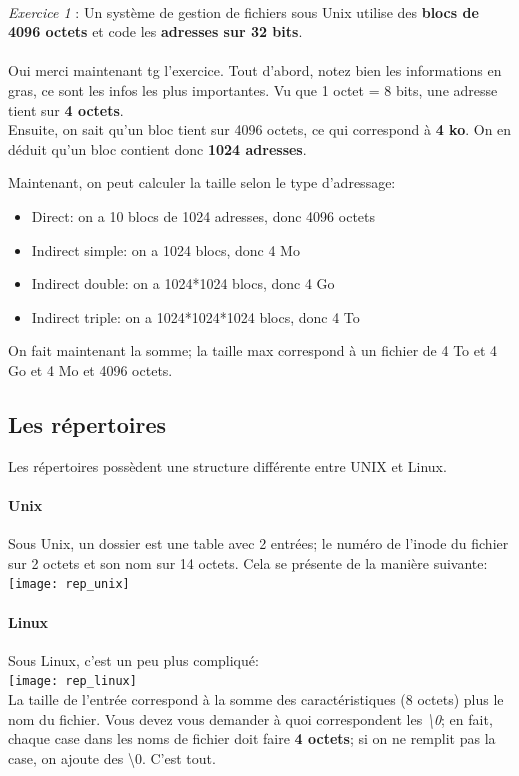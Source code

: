 \documentclass{report}
\begin{document}
\paragraph{}
\emph{Exercice 1} : Un système de gestion de fichiers sous Unix utilise des \textbf{blocs de 4096 octets} et code les \textbf{adresses sur 32 bits}.
\\
\\
Oui merci maintenant tg l'exercice. Tout d'abord, notez bien les informations en gras, ce sont les infos les plus importantes. Vu que 1 octet = 8 bits, une adresse tient sur \textbf{4 octets}. \\
Ensuite, on sait qu'un bloc tient sur 4096 octets, ce qui correspond à \textbf{4 ko}. On en déduit qu'un bloc contient donc \textbf{1024 adresses}.

Maintenant, on peut calculer la taille selon le type d'adressage:
\begin{itemize}
\item{Direct: on a 10 blocs de 1024 adresses, donc 4096 octets}
\item{Indirect simple: on a 1024 blocs, donc 4 Mo}
\item{Indirect double: on a 1024*1024 blocs, donc 4 Go}
\item{Indirect triple: on a 1024*1024*1024 blocs, donc 4 To}
\end{itemize}
On fait maintenant la somme; la taille max correspond à un fichier de 4 To et 4 Go et 4 Mo et 4096 octets.

\subsection{Les répertoires}
Les répertoires possèdent une structure différente entre UNIX et Linux.
\paragraph{Unix}
Sous Unix, un dossier est une table avec 2 entrées; le numéro de l'inode du fichier sur 2 octets et son nom sur 14 octets. Cela se présente de la manière suivante:\\
\texttt{[image: rep\_unix]}
\\
\paragraph{Linux}
Sous Linux, c'est un peu plus compliqué:\\
\texttt{[image: rep\_linux]}
\\
La taille de l'entrée correspond à la somme des caractéristiques (8 octets) plus le nom du fichier. Vous devez vous demander à quoi correspondent les \emph{\textbackslash 0}; en fait, chaque case dans les noms de fichier doit faire \textbf{4 octets}; si on ne remplit pas la case, on ajoute des \textbackslash0. C'est tout.
\end{document}
